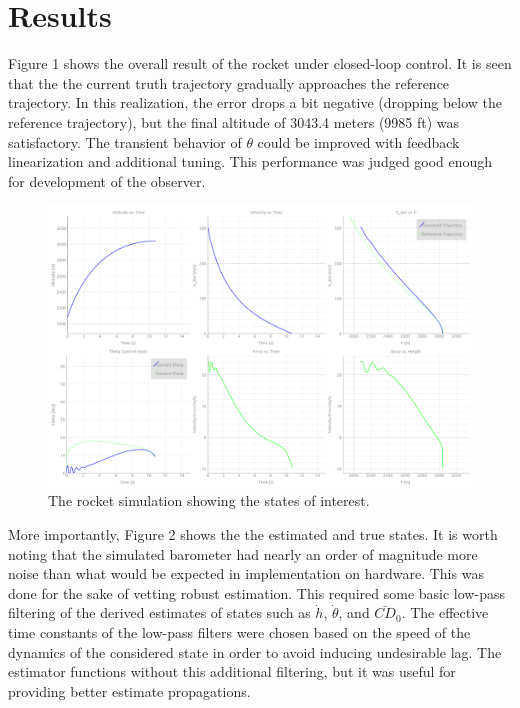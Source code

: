 \documentclass{article}
\begin{document}
  \section{Results}
  Figure 1 shows the overall result of the rocket under closed-loop control. It is seen that the the current truth trajectory gradually approaches the reference trajectory. In this realization, the error drops a bit negative (dropping below the reference trajectory), but the final altitude of 3043.4 meters (9985 ft) was satisfactory. The transient behavior of $\theta$ could be improved with feedback linearization and additional tuning. This performance was judged good enough for development of the observer.

  \begin{figure}
    \includegraphics[width=\linewidth]{figures/main.png}
    \caption{The rocket simulation showing the states of interest.}
    \label{fig:main}
  \end{figure}

  More importantly, Figure 2 shows the the estimated and true states. It is worth noting that the simulated barometer had nearly an order of magnitude more noise than what would be expected in implementation on hardware. This was done for the sake of vetting robust estimation. This required some basic low-pass filtering of the derived estimates of states such as $\dot{h}$, $\dot{\theta}$, and $\bar{CD}_0$. The effective time constants of the low-pass filters were chosen based on the speed of the dynamics of the considered state in order to avoid inducing undesirable lag. The estimator functions without this additional filtering, but it was useful for providing better estimate propagations.
\end{document}

